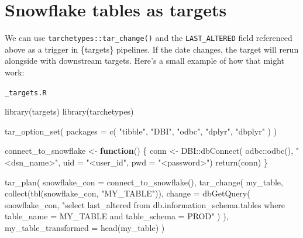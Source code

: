 \documentclass[
  letterpaper,
  DIV=11,
  numbers=noendperiod]{scrreprt}
\newenvironment{Shaded}{\begin{snugshade}}{\end{snugshade}}
\newcommand{\AttributeTok}[1]{\textcolor[rgb]{0.40,0.45,0.13}{#1}}
\newcommand{\ControlFlowTok}[1]{\textcolor[rgb]{0.00,0.23,0.31}{\textbf{#1}}}
\newcommand{\FunctionTok}[1]{\textcolor[rgb]{0.28,0.35,0.67}{#1}}
\newcommand{\NormalTok}[1]{\textcolor[rgb]{0.00,0.23,0.31}{#1}}
\newcommand{\OtherTok}[1]{\textcolor[rgb]{0.00,0.23,0.31}{#1}}
\newcommand{\SpecialCharTok}[1]{\textcolor[rgb]{0.37,0.37,0.37}{#1}}
\newcommand{\StringTok}[1]{\textcolor[rgb]{0.13,0.47,0.30}{#1}}
\begin{document}
\section{Snowflake tables as targets}\label{snowflake-tables-as-targets}

We can use \texttt{tarchetypes::tar\_change()} and the
\texttt{LAST\_ALTERED} field referenced above as a trigger in
\{targets\} pipelines. If the date changes, the target will rerun
alongside with downstream targets. Here's a small example of how that
might work:

\texttt{\_targets.R}

\begin{Shaded}
\begin{Highlighting}[]
\FunctionTok{library}\NormalTok{(targets)}
\FunctionTok{library}\NormalTok{(tarchetypes)}

\FunctionTok{tar\_option\_set}\NormalTok{(}
  \AttributeTok{packages =} \FunctionTok{c}\NormalTok{(}
    \StringTok{"tibble"}\NormalTok{,}
    \StringTok{"DBI"}\NormalTok{,}
    \StringTok{"odbc"}\NormalTok{,}
    \StringTok{"dplyr"}\NormalTok{,}
    \StringTok{"dbplyr"}
\NormalTok{    )}
\NormalTok{  )}

\NormalTok{connect\_to\_snowflake }\OtherTok{\textless{}{-}} \ControlFlowTok{function}\NormalTok{() \{}
\NormalTok{  conn }\OtherTok{\textless{}{-}}\NormalTok{ DBI}\SpecialCharTok{::}\FunctionTok{dbConnect}\NormalTok{(}
\NormalTok{    odbc}\SpecialCharTok{::}\FunctionTok{odbc}\NormalTok{(),}
    \StringTok{"\textless{}dsn\_name\textgreater{}"}\NormalTok{,}
    \AttributeTok{uid =} \StringTok{"\textless{}user\_id"}\NormalTok{,}
    \AttributeTok{pwd =} \StringTok{"\textless{}password\textgreater{}"}\NormalTok{)}
  \FunctionTok{return}\NormalTok{(conn)}
\NormalTok{\}}

\FunctionTok{tar\_plan}\NormalTok{(}
  \AttributeTok{snowflake\_con =} \FunctionTok{connect\_to\_snowflake}\NormalTok{(),}
  \FunctionTok{tar\_change}\NormalTok{(}
\NormalTok{    my\_table,}
    \FunctionTok{collect}\NormalTok{(}\FunctionTok{tbl}\NormalTok{(snowflake\_con, }\StringTok{"MY\_TABLE"}\NormalTok{)),}
    \AttributeTok{change =} \FunctionTok{dbGetQuery}\NormalTok{(}
\NormalTok{      snowflake\_con,}
      \StringTok{"select last\_altered from db.information\_schema.tables where table\_name = \textquotesingle{}MY\_TABLE\textquotesingle{} and table\_schema = \textquotesingle{}PROD\textquotesingle{}"}
\NormalTok{      )}
\NormalTok{  ),}
  \AttributeTok{my\_table\_transformed =} \FunctionTok{head}\NormalTok{(my\_table)}
\NormalTok{)}
\end{Highlighting}
\end{Shaded}
\end{document}
